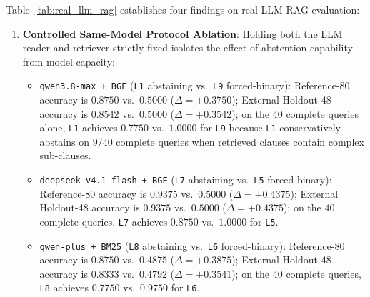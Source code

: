 \documentclass[10pt,twocolumn]{article}
\renewcommand{\_}{\textunderscore\allowbreak}
\begin{document}
Table~\ref{tab:real_llm_rag} establishes four findings on real LLM RAG evaluation:
\begin{enumerate}[leftmargin=*,nosep]
  \item \textbf{Controlled Same-Model Protocol Ablation}: Holding both the LLM reader and retriever strictly fixed isolates the effect of abstention capability from model capacity:
  \begin{itemize}[leftmargin=*,nosep]
    \item \texttt{qwen3.8-max + BGE} (\texttt{L1} abstaining vs.\ \texttt{L9} forced-binary): Reference-80 accuracy is $0.8750$ vs.\ $0.5000$ ($\Delta = +0.3750$); External Holdout-48 accuracy is $0.8542$ vs.\ $0.5000$ ($\Delta = +0.3542$); on the $40$ complete queries alone, \texttt{L1} achieves $0.7750$ vs.\ $1.0000$ for \texttt{L9} because \texttt{L1} conservatively abstains on $9/40$ complete queries when retrieved clauses contain complex sub-clauses.
    \item \texttt{deepseek-v4.1-flash + BGE} (\texttt{L7} abstaining vs.\ \texttt{L5} forced-binary): Reference-80 accuracy is $0.9375$ vs.\ $0.5000$ ($\Delta = +0.4375$); External Holdout-48 accuracy is $0.9375$ vs.\ $0.5000$ ($\Delta = +0.4375$); on the $40$ complete queries, \texttt{L7} achieves $0.8750$ vs.\ $1.0000$ for \texttt{L5}.
    \item \texttt{qwen-plus + BM25} (\texttt{L8} abstaining vs.\ \texttt{L6} forced-binary): Reference-80 accuracy is $0.8750$ vs.\ $0.4875$ ($\Delta = +0.3875$); External Holdout-48 accuracy is $0.8333$ vs.\ $0.4792$ ($\Delta = +0.3541$); on the $40$ complete queries, \texttt{L8} achieves $0.7750$ vs.\ $0.9750$ for \texttt{L6}.
  \end{itemize}

\end{enumerate}
\end{document}
